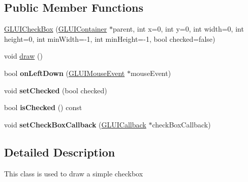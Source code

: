 \subsection*{Public Member Functions}
\begin{DoxyCompactItemize}
\item 
\hyperlink{classCartWheel_1_1GL_1_1GLUICheckBox_ac011fb61a8befd7dae805328dbecc977}{GLUICheckBox} (\hyperlink{classCartWheel_1_1GL_1_1GLUIContainer}{GLUIContainer} $\ast$parent, int x=0, int y=0, int width=0, int height=0, int minWidth=-\/1, int minHeight=-\/1, bool checked=false)
\item 
void \hyperlink{classCartWheel_1_1GL_1_1GLUICheckBox_a4bb77220bc4127503de50f2af0528125}{draw} ()
\item 
\hypertarget{classCartWheel_1_1GL_1_1GLUICheckBox_a114f06c3f316a5c5874dddecb953eec3}{
bool {\bfseries onLeftDown} (\hyperlink{classCartWheel_1_1GL_1_1GLUIMouseEvent}{GLUIMouseEvent} $\ast$mouseEvent)}
\label{classCartWheel_1_1GL_1_1GLUICheckBox_a114f06c3f316a5c5874dddecb953eec3}

\item 
\hypertarget{classCartWheel_1_1GL_1_1GLUICheckBox_afb2b2e97b3d3d5deb9d75c9370d38075}{
void {\bfseries setChecked} (bool checked)}
\label{classCartWheel_1_1GL_1_1GLUICheckBox_afb2b2e97b3d3d5deb9d75c9370d38075}

\item 
\hypertarget{classCartWheel_1_1GL_1_1GLUICheckBox_a3e78c4215e16d19e178c57ac710111e2}{
bool {\bfseries isChecked} () const }
\label{classCartWheel_1_1GL_1_1GLUICheckBox_a3e78c4215e16d19e178c57ac710111e2}

\item 
\hypertarget{classCartWheel_1_1GL_1_1GLUICheckBox_a7da34c855f7614968794c457929af119}{
void {\bfseries setCheckBoxCallback} (\hyperlink{classCartWheel_1_1GL_1_1GLUICallback}{GLUICallback} $\ast$checkBoxCallback)}
\label{classCartWheel_1_1GL_1_1GLUICheckBox_a7da34c855f7614968794c457929af119}

\end{DoxyCompactItemize}


\subsection{Detailed Description}
This class is used to draw a simple checkbox 

